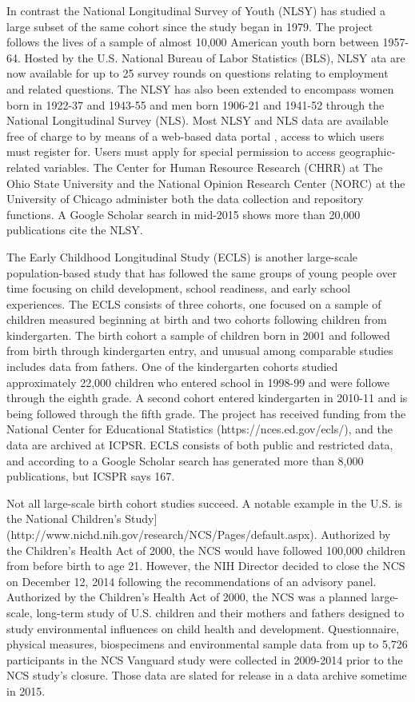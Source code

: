 \documentclass[letterpaper,man,apacite]{apa6}
\begin{document}
In contrast the National Longitudinal Survey of Youth (NLSY) \cite{NLSY} has studied a large subset of the same cohort since the study began in 1979.
The project follows the lives of a sample of almost 10,000 American youth born between 1957-64.
Hosted by the U.S. National Bureau of Labor Statistics (BLS), NLSY ata are now available for up to 25 survey rounds on questions relating to employment and related questions.
The NLSY has also been extended to encompass women born in 1922-37 and 1943-55 and men born 1906-21 and 1941-52 through the National Longitudinal Survey (NLS).
Most NLSY and NLS data are available free of charge to by means of a web-based data portal \cite{NLSY_data}, access to which users must register for.
Users must apply for special permission to access geographic-related variables.
The Center for Human Resource Research (CHRR) at The Ohio State University and the National Opinion Research Center (NORC) at the University of Chicago administer both the data collection and repository functions.
A Google Scholar search in mid-2015 shows more than 20,000 publications cite the NLSY.

The Early Childhood Longitudinal Study (ECLS) is another large-scale population-based study that has followed the same groups of young people over time focusing on child development, school readiness, and early school experiences. 
The ECLS consists of three cohorts, one focused on a sample of children measured beginning at birth and two cohorts following children from kindergarten.
The birth cohort a sample of children born in 2001 and followed from birth through kindergarten entry, and unusual among comparable studies includes data from fathers. 
One of the kindergarten cohorts studied approximately 22,000 children who entered school in 1998-99 and were followe through the eighth grade. 
A second cohort entered kindergarten in 2010-11 and is being followed through the fifth grade.
The project has received funding from the National Center for Educational Statistics (https://nces.ed.gov/ecls/), and the data are archived at ICPSR.
ECLS consists of both public and restricted data, and according to a Google Scholar search has generated more than 8,000 publications, but ICSPR says 167.

Not all large-scale birth cohort studies succeed.
A notable example in the U.S. is the National Children's Study](http://www.nichd.nih.gov/research/NCS/Pages/default.aspx).
Authorized by the Children's Health Act of 2000, the NCS would have followed 100,000 children from before birth to age 21. 
However, the NIH Director decided to close the NCS on December 12, 2014 following the recommendations of an advisory panel.
Authorized by the Children’s Health Act of 2000, the NCS was a planned large-scale, long-term study of U.S. children and their mothers and fathers designed to study environmental influences on child health and development. 
Questionnaire, physical measures, biospecimens and environmental sample data from up to 5,726 participants in the NCS Vanguard study were collected in 2009-2014 prior to the NCS study's closure.
Those data are slated for release in a data archive sometime in 2015. 
\end{document}
